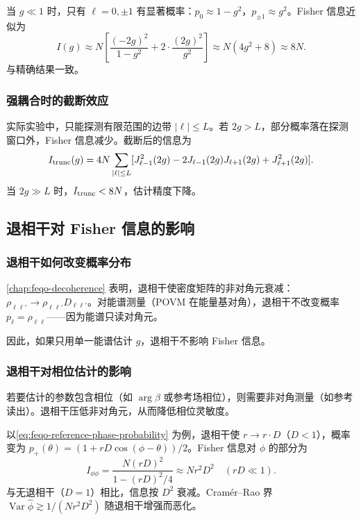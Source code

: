 当 $g\ll 1$ 时，只有 $\ell=0,\pm 1$ 有显著概率：$p_0\approx 1-g^2$，$p_{\pm 1}\approx g^2$。Fisher 信息近似为
\begin{equation}
I(g)\approx N\left[\frac{(-2g)^2}{1-g^2}+2\cdot\frac{(2g)^2}{g^2}\right]
\approx N(4g^2+8)\approx 8N.
\label{eq:feqo-fisher-weak-g}
\end{equation}
与精确结果一致。

\subsubsection{强耦合时的截断效应}

实际实验中，只能探测有限范围的边带 $|\ell|\leq L$。若 $2g>L$，部分概率落在探测窗口外，Fisher 信息减少。截断后的信息为
\begin{equation}
I_{\rm trunc}(g)=4N\sum_{|\ell|\leq L}[J_{\ell-1}^2(2g)-2J_{\ell-1}(2g)J_{\ell+1}(2g)+J_{\ell+1}^2(2g)].
\label{eq:feqo-fisher-truncated}
\end{equation}
当 $2g\gg L$ 时，$I_{\rm trunc}<8N$，估计精度下降。

\subsection{退相干对 Fisher 信息的影响}

\subsubsection{退相干如何改变概率分布}

\cref{chap:feqo-decoherence} 表明，退相干使密度矩阵的非对角元衰减：$\rho_{\ell\ell'}\to\rho_{\ell\ell'}D_{\ell\ell'}$。对能谱测量（POVM 在能量基对角），退相干不改变概率 $p_\ell=\rho_{\ell\ell}$——因为能谱只读对角元。

因此，如果只用单一能谱估计 $g$，退相干不影响 Fisher 信息。

\subsubsection{退相干对相位估计的影响}

若要估计的参数包含相位（如 $\arg\beta$ 或参考场相位），则需要非对角测量（如参考读出）。退相干压低非对角元，从而降低相位灵敏度。

以\cref{eq:feqo-reference-phase-probability} 为例，退相干使 $r\to r\cdot D$（$D<1$），概率变为 $p_+(\theta)=(1+rD\cos(\phi-\theta))/2$。Fisher 信息对 $\phi$ 的部分为
\begin{equation}
I_{\phi\phi}=\frac{N(rD)^2}{1-(rD)^2/4}\approx Nr^2D^2\quad(rD\ll 1).
\label{eq:feqo-fisher-phase-decoherence}
\end{equation}
与无退相干（$D=1$）相比，信息按 $D^2$ 衰减。Cram\'er--Rao 界 $\operatorname{Var}\hat\phi\gtrsim 1/(Nr^2D^2)$ 随退相干增强而恶化。


